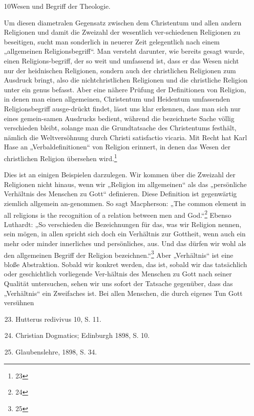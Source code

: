 {\large 10\hfill Wesen und Begriff der Theologie.}

Um diesen diametralen Gegensatz zwischen dem Christentum und allen andern Religionen und damit die Zweizahl der wesentlich ver-schiedenen Religionen zu beseitigen, sucht man sonderlich in neuerer Zeit gelegentlich nach einem „allgemeinen Religionsbegriff“. Man versteht darunter, wie bereits gesagt wurde, einen Religions-begriff, der so weit und umfassend ist, dass er das Wesen nicht nur der heidnischen Religionen, sondern auch der christlichen Religionen zum Ausdruck bringt, also die nichtchristlichen Religionen und die christliche Religion unter ein genus befasst. Aber eine nähere Prüfung der Definitionen von Religion, in denen man einen allgemeinen, Christentum und Heidentum umfassenden Religionsbegriff ausge-drückt findet, lässt uns klar erkennen, dass man sich nur eines gemein-samen Ausdrucks bedient, während die bezeichnete Sache völlig verschieden bleibt, solange man die Grundtatsache des Christentums festhält, nämlich die Weltversöhnung durch Christi satisfactio vicaria. Mit Recht hat Karl Hase an „Verbaldefinitionen“ von Religion erinnert, in denen das Wesen der christlichen Religion übersehen wird.\footnote{23}

Dies ist an einigen Beispielen darzulegen. Wir kommen über die Zweizahl der Religionen nicht hinaus, wenn wir „Religion im allgemeinen“ als das „persönliche Verhältnis des Menschen zu Gott“ definieren. Diese Definition ist gegenwärtig ziemlich allgemein an-genommen. So sagt Macpherson: „The common element in all religions is the recognition of a relation between men and God.“\footnote{24} Ebenso Luthardt: „So verschieden die Bezeichnungen für das, was wir Religion nennen, sein mögen, in allen spricht sich doch ein Verhältnis zur Gottheit, wenn auch ein mehr oder minder innerliches und persönliches, aus. Und das dürfen wir wohl als den allgemeinen Begriff der Religion bezeichnen.“\footnote{25} Aber „Verhältnis“ ist eine bloße Abstraktion. Sobald wir konkret werden, das ist, sobald wir das tatsächlich oder geschichtlich vorliegende Ver-hältnis des Menschen zu Gott nach seiner Qualität untersuchen, sehen wir uns sofort der Tatsache gegenüber, dass das „Verhältnis“ ein Zweifaches ist. Bei allen Menschen, die durch eigenes Tun Gott versühnen

\tiny
\begin{enumerate}
    \setcounter{enumi}{22}
    \item Hutterus redivivus 10, S. 11.
    \item Christian Dogmatics; Edinburgh 1898, S. 10.
    \item Glaubenslehre, 1898, S. 34.
\end{enumerate}
